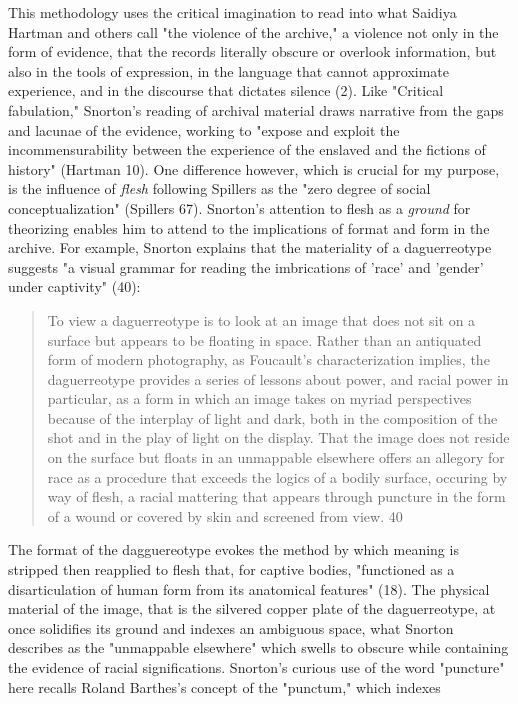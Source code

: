 \documentclass[11pt]{article}
\begin{document}
This methodology uses the critical imagination to read into what
Saidiya Hartman and others call "the violence of the archive," a
violence not only in the form of evidence, that the records literally
obscure or overlook information, but also in the tools of expression,
in the language that cannot approximate experience, and in the
discourse that dictates silence (2). Like "Critical fabulation,"
Snorton's reading of archival material draws narrative from the gaps
and lacunae of the evidence, working to "expose and exploit the
incommensurability between the experience of the enslaved and the
fictions of history" (Hartman 10). One difference however, which is
crucial for my purpose, is the influence of \emph{flesh} following Spillers
as the "zero degree of social conceptualization" (Spillers
67). Snorton's attention to flesh as a \emph{ground} for theorizing enables
him to attend to the implications of format and form in the
archive. For example, Snorton explains that the materiality of a
daguerreotype suggests "a visual grammar for reading the imbrications
of 'race' and 'gender' under captivity" (40):
\begin{quote}
To view a daguerreotype is to look at an image that does not sit on a
surface but appears to be floating in space. Rather than an antiquated
form of modern photography, as Foucault’s characterization implies,
the daguerreotype provides a series of lessons about power, and racial
power in particular, as a form in which an image takes on myriad
perspectives because of the interplay of light and dark, both in the
composition of the shot and in the play of light on the display. That
the image does not reside on the surface but floats in an unmappable
elsewhere offers an allegory for race as a procedure that exceeds the
logics of a bodily surface, occuring by way of flesh, a racial
mattering that appears through puncture in the form of a wound or
covered by skin and screened from view. 40
\end{quote}
The format of the dagguereotype evokes the method by which meaning is
stripped then reapplied to flesh that, for captive bodies, "functioned
as a disarticulation of human form from its anatomical features"
(18). The physical material of the image, that is the silvered copper
plate of the daguerreotype, at once solidifies its ground and indexes
an ambiguous space, what Snorton describes as the "unmappable
elsewhere" which swells to obscure while containing the evidence of
racial significations. Snorton's curious use of the word "puncture"
here recalls Roland Barthes's concept of the "punctum," which indexes
\end{document}
